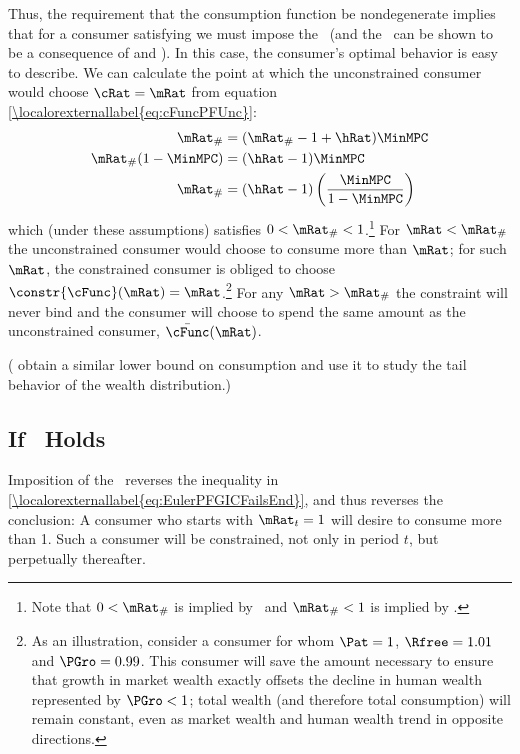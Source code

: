 \documentclass[\econtexRoot/BufferStockTheory]{subfiles}
\begin{document}
Thus, the requirement that the consumption function be nondegenerate
implies that for a consumer satisfying \cncl{\PFGIC} we must impose
the \RIC~(and the \FHWC~can be shown to be a consequence of \cncl{\PFGIC} and \RIC).  In
this case, the consumer's optimal behavior is easy to describe.  We
can calculate the point at which the unconstrained consumer would
choose $\cRat = \mRat$ from equation \eqref{\localorexternallabel{eq:cFuncPFUnc}}:
\begin{equation}\begin{gathered}\begin{aligned}
  \mRat_{\#}  & = (\mRat_{\#}-1+\hRat)\MinMPC
  \\ \mRat_{\#}(1-\MinMPC)  & = (\hRat - 1)\MinMPC
  \\ \mRat_{\#}  & = (\hRat - 1)\left(\frac{\MinMPC}{1-\MinMPC}\right)
\end{aligned}\end{gathered}\end{equation}
which (under these assumptions) satisfies $0 < \mRat_{\#} < 1$.\footnote{Note that $0 < \mRat_{\#}$ is implied by \RIC~and $ \mRat_{\#}<1$ is implied by \cncl{\PFGIC}.}  For
$\mRat < \mRat_{\#}$ the unconstrained consumer would choose to
consume more than $\mRat$; for such $\mRat$, the constrained consumer
is obliged to choose $\constr{\cFunc}(\mRat) = \mRat$.\footnote{As an
  illustration, consider a consumer for whom $\Pat = 1$, $\Rfree
  =1.01$ and $\PGro = 0.99$.  This consumer will save the amount
  necessary to ensure that growth in market wealth exactly offsets the
  decline in human wealth represented by $\PGro < 1$; total wealth
  (and therefore total consumption) will remain constant, even as
  market wealth and human wealth trend in opposite directions.}  For
any $\mRat > \mRat_{\#}$ the constraint will never bind and the
consumer will choose to spend the same amount as the unconstrained
consumer, $\bar{\cFunc}(\mRat)$.

(\cite{StachurskiToda2019JET} obtain a similar lower bound on consumption and use it to study the tail behavior of the wealth distribution.)

\subsection{If \PFGIC~Holds}

Imposition of the \PFGIC~reverses the inequality in
\eqref{\localorexternallabel{eq:EulerPFGICFailsEnd}}, and thus
reverses the conclusion: A consumer who starts with $\mRat_{t}=1$ will
desire to consume more than 1.  Such a consumer will be constrained,
not only in period $t$, but perpetually thereafter.
\end{document}
